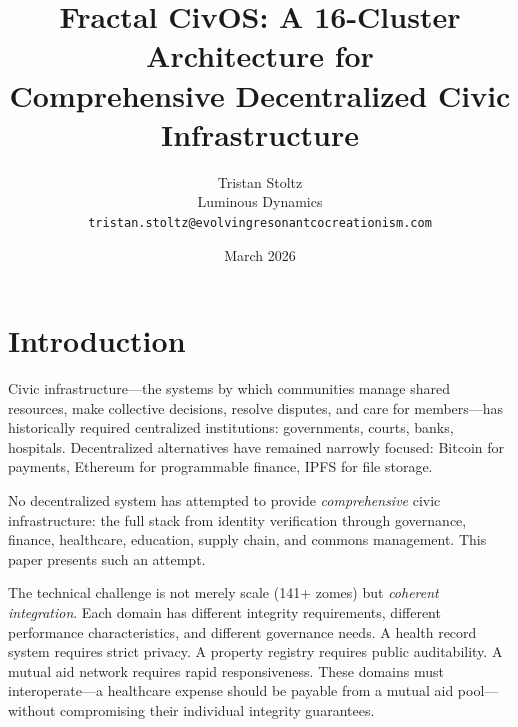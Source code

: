 \documentclass[11pt,twocolumn]{article}
\title{Fractal CivOS: A 16-Cluster Architecture for\\Comprehensive Decentralized Civic Infrastructure}
\author{Tristan Stoltz \\ Luminous Dynamics \\ \texttt{tristan.stoltz@evolvingresonantcocreationism.com}}
\date{March 2026}
\begin{document}

\section{Introduction}

Civic infrastructure---the systems by which communities manage shared resources,
make collective decisions, resolve disputes, and care for members---has
historically required centralized institutions: governments, courts, banks,
hospitals. Decentralized alternatives have remained narrowly focused: Bitcoin
for payments, Ethereum for programmable finance, IPFS for file storage.

No decentralized system has attempted to provide \emph{comprehensive} civic
infrastructure: the full stack from identity verification through governance,
finance, healthcare, education, supply chain, and commons management. This
paper presents such an attempt.

The technical challenge is not merely scale (141+ zomes) but
\emph{coherent integration}. Each domain has different integrity requirements,
different performance characteristics, and different governance needs. A health
record system requires strict privacy. A property registry requires public
auditability. A mutual aid network requires rapid responsiveness. These domains
must interoperate---a healthcare expense should be payable from a mutual aid
pool---without compromising their individual integrity guarantees.
\end{document}

